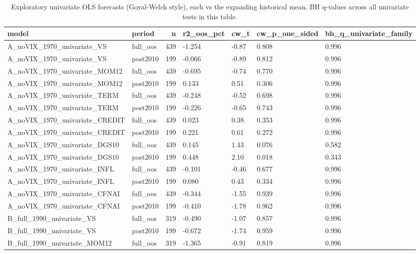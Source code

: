 \begin{table}
\caption{Exploratory univariate OLS forecasts (Goyal-Welch style), each vs the expanding historical mean. BH q-values across all univariate tests in this table.}
\label{tab:m6_oos_univariate}
\begin{tabular}{llrllll}
\toprule
model & period & n & r2\_oos\_pct & cw\_t & cw\_p\_one\_sided & bh\_q\_univariate\_family \\
\midrule
A\_noVIX\_1970\_univariate\_VS & full\_oos & 439 & -1.254 & -0.87 & 0.808 & 0.996 \\
A\_noVIX\_1970\_univariate\_VS & post2010 & 199 & -0.066 & -0.89 & 0.812 & 0.996 \\
A\_noVIX\_1970\_univariate\_MOM12 & full\_oos & 439 & -0.695 & -0.74 & 0.770 & 0.996 \\
A\_noVIX\_1970\_univariate\_MOM12 & post2010 & 199 & 0.133 & 0.51 & 0.306 & 0.996 \\
A\_noVIX\_1970\_univariate\_TERM & full\_oos & 439 & -0.248 & -0.52 & 0.698 & 0.996 \\
A\_noVIX\_1970\_univariate\_TERM & post2010 & 199 & -0.226 & -0.65 & 0.743 & 0.996 \\
A\_noVIX\_1970\_univariate\_CREDIT & full\_oos & 439 & 0.023 & 0.38 & 0.353 & 0.996 \\
A\_noVIX\_1970\_univariate\_CREDIT & post2010 & 199 & 0.221 & 0.61 & 0.272 & 0.996 \\
A\_noVIX\_1970\_univariate\_DGS10 & full\_oos & 439 & 0.145 & 1.43 & 0.076 & 0.582 \\
A\_noVIX\_1970\_univariate\_DGS10 & post2010 & 199 & 0.448 & 2.10 & 0.018 & 0.343 \\
A\_noVIX\_1970\_univariate\_INFL & full\_oos & 439 & -0.101 & -0.46 & 0.677 & 0.996 \\
A\_noVIX\_1970\_univariate\_INFL & post2010 & 199 & 0.080 & 0.43 & 0.334 & 0.996 \\
A\_noVIX\_1970\_univariate\_CFNAI & full\_oos & 439 & -0.344 & -1.55 & 0.939 & 0.996 \\
A\_noVIX\_1970\_univariate\_CFNAI & post2010 & 199 & -0.410 & -1.78 & 0.962 & 0.996 \\
B\_full\_1990\_univariate\_VS & full\_oos & 319 & -0.490 & -1.07 & 0.857 & 0.996 \\
B\_full\_1990\_univariate\_VS & post2010 & 199 & -0.672 & -1.74 & 0.959 & 0.996 \\
B\_full\_1990\_univariate\_MOM12 & full\_oos & 319 & -1.365 & -0.91 & 0.819 & 0.996 \\

\end{tabular}
\end{table}

